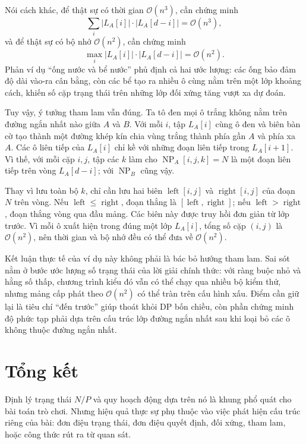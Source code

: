 \documentclass[11pt]{article}
\newcommand{\Oh}{\mathcal{O}}
\newcommand{\NP}{\operatorname{NP}}
\begin{document}
Nói cách khác, để thật sự có thời gian \(\Oh(n^3)\), cần chứng minh
\[
  \sum_i |L_A[i]|\cdot |L_A[d-i]|=\Oh(n^3),
\]
và để thật sự có bộ nhớ \(\Oh(n^2)\), cần chứng minh
\[
  \max_i |L_A[i]|\cdot |L_A[d-i]|=\Oh(n^2).
\]
Phản ví dụ ``ống nước và bể nước'' phủ định cả hai ước lượng: các ống bảo đảm
độ dài vào-ra cân bằng, còn các bể tạo ra nhiều ô cùng nằm trên một lớp khoảng
cách, khiến số cặp trạng thái trên những lớp đối xứng tăng vượt xa dự đoán.

Tuy vậy, ý tưởng tham lam vẫn đúng. Ta tô đen mọi ô trắng không nằm trên đường
ngắn nhất nào giữa \(A\) và \(B\). Với mỗi \(i\), tập \(L_A[i]\) cùng ô đen và
biên bàn cờ tạo thành một đường khép kín chia vùng trắng thành phía gần \(A\)
và phía xa \(A\). Các ô liên tiếp của \(L_A[i]\) chỉ kề với những đoạn liên
tiếp trong \(L_A[i+1]\). Vì thế, với mỗi cặp \(i,j\), tập các \(k\) làm cho
\(\NP_A[i,j,k]=N\) là một đoạn liên tiếp trên vòng \(L_A[d-i]\); với
\(\NP_B\) cũng vậy.

Thay vì lưu toàn bộ \(k\), chỉ cần lưu hai biên
\(\operatorname{left}[i,j]\) và \(\operatorname{right}[i,j]\) của đoạn \(N\)
trên vòng. Nếu \(\operatorname{left}\le\operatorname{right}\), đoạn thắng là
\([\operatorname{left},\operatorname{right}]\); nếu
\(\operatorname{left}>\operatorname{right}\), đoạn thắng vòng qua đầu mảng.
Các biên này được truy hồi đơn giản từ lớp trước. Vì mỗi ô xuất hiện trong
đúng một lớp \(L_A[i]\), tổng số cặp \((i,j)\) là \(\Oh(n^2)\), nên thời gian
và bộ nhớ đều có thể đưa về \(\Oh(n^2)\).

Kết luận thực tế của ví dụ này không phải là bác bỏ hướng tham lam. Sai sót nằm
ở bước ước lượng số trạng thái của lời giải chính thức: với ràng buộc nhỏ và
hằng số thấp, chương trình kiểu đó vẫn có thể chạy qua nhiều bộ kiểm thử, nhưng
mảng cấp phát theo \(\Oh(n^2)\) có thể tràn trên cấu hình xấu. Điểm cần giữ lại
là tiêu chí ``đến trước'' giúp thoát khỏi DP bốn chiều, còn phần chứng minh độ
phức tạp phải dựa trên cấu trúc lớp đường ngắn nhất sau khi loại bỏ các ô không
thuộc đường ngắn nhất.

\section{Tổng kết}

Định lý trạng thái \(N/P\) và quy hoạch động dựa trên nó là khung phổ quát cho
bài toán trò chơi. Nhưng hiệu quả thực sự phụ thuộc vào việc phát hiện cấu
trúc riêng của bài: đơn điệu trạng thái, đơn điệu quyết định, đối xứng, tham
lam, hoặc công thức rút ra từ quan sát.
\end{document}
